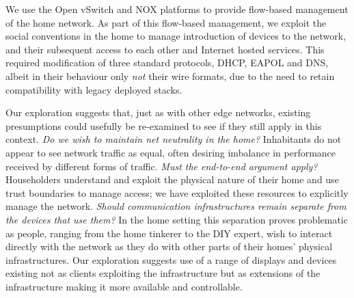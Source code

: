 We use the Open vSwitch and NOX platforms to provide flow-based
management of the home network.  As part of this flow-based
management, we exploit the social conventions in the home to manage
introduction of devices  to the network, and their subsequent access
to each other and Internet hosted services.  This required
modification of three standard protocols, DHCP, EAPOL and DNS, albeit
in their behaviour only \emph{not} their wire formats, due to the need to
retain compatibility with legacy deployed stacks.
                                                         
                          

Our exploration suggests that, just as with other edge networks,
existing presumptions could usefully be re-examined to see if they
still apply in this context.  \emph{Do we wish to maintain net
  neutrality in the home?} Inhabitants do not appear to see network
traffic as equal, often desiring imbalance in performance received by
different forms of traffic.  \emph{Must the end-to-end argument
  apply?} Householders understand and exploit the physical nature of
their home and use trust boundaries to manage access; we have
exploited these resources to explicitly manage the network.
\emph{Should communication infrastructures remain separate from the
  devices that use them?} In the home setting this separation proves
problematic as people, ranging from the home tinkerer to the DIY
expert, wish to interact directly with the network as they do with
other parts of their homes' physical infrastructures.  Our exploration
suggests use of a range of displays and devices existing not as
clients exploiting the infrastructure but as extensions of the
infrastructure making it more available and controllable.

